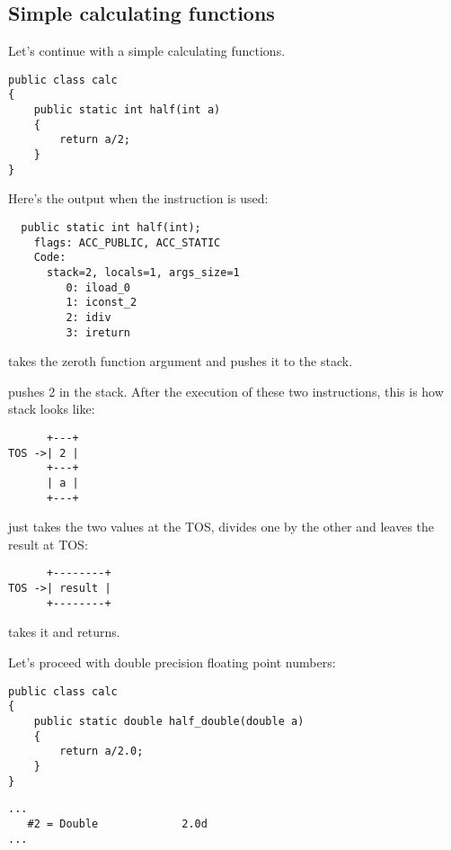 \subsection{Simple calculating functions}

Let's continue with a simple calculating functions.

\begin{lstlisting}
public class calc
{
	public static int half(int a)
	{
		return a/2;
	}
}
\end{lstlisting}

Here's the output when the  instruction is used:


\begin{lstlisting}
  public static int half(int);
    flags: ACC_PUBLIC, ACC_STATIC
    Code:
      stack=2, locals=1, args_size=1
         0: iload_0       
         1: iconst_2      
         2: idiv          
         3: ireturn       
\end{lstlisting}
         
 takes the zeroth function argument and pushes it to the stack.

 pushes 2 in the stack.
After the execution of these two instructions, this is how stack looks like:


\begin{lstlisting}
      +---+
TOS ->| 2 |
      +---+
      | a |
      +---+
\end{lstlisting}

 just takes the two values at the \ac{TOS}, divides one by the other and leaves
the result at \ac{TOS}:


\begin{lstlisting}
      +--------+
TOS ->| result |
      +--------+
\end{lstlisting}

 takes it and returns.

Let's proceed with double precision floating point numbers:


\begin{lstlisting}
public class calc
{
	public static double half_double(double a)
	{
		return a/2.0;
	}
}
\end{lstlisting}

\begin{lstlisting}[caption=Constant pool]
...
   #2 = Double             2.0d
...
\end{lstlisting}

